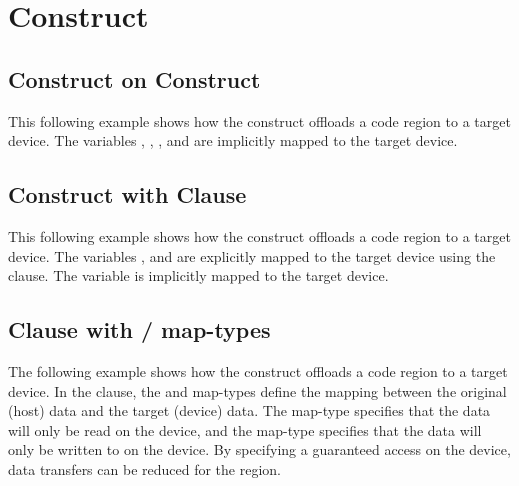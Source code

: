 \pagebreak
\section{ Construct}
\label{sec:target}

\subsection{ Construct on  Construct}
\label{subsec:target_parallel}

This following example shows how the  construct offloads a code 
region to a target device. The variables , , , and  are implicitly mapped 
to the target device.



\subsection{ Construct with  Clause}
\label{subsec:target_map}

This following example shows how the  construct offloads a code 
region to a target device. The variables ,  and  are explicitly mapped to the 
target device using the  clause. The variable  is implicitly mapped to 
the target device.



\subsection{ Clause with / map-types}
\label{subsec:target_map_tofrom}

The following example shows how the  construct offloads a code region 
to a target device. In the  clause, the  and  
map-types define the mapping between the original (host) data and the target (device) 
data. The  map-type specifies that the data will only be read on the 
device, and the  map-type specifies that the data will only be written 
to on the device. By specifying a guaranteed access on the device, data transfers 
can be reduced for the  region.

